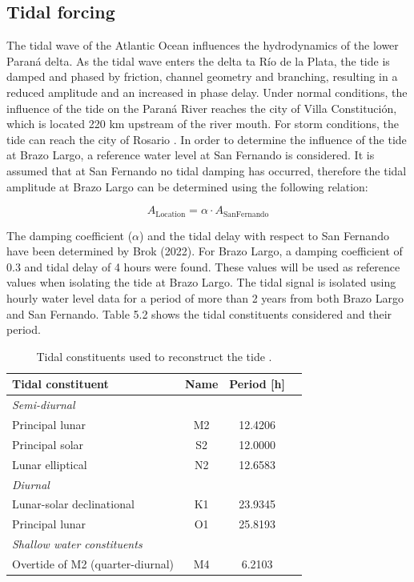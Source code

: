 \subsection{Tidal forcing}
The tidal wave of the Atlantic Ocean influences the hydrodynamics of the lower Paraná delta. As the tidal wave enters the delta ta Río de la Plata, the tide is damped and phased by friction, channel geometry and branching, resulting in a reduced amplitude and an increased in phase delay. Under normal conditions, the influence of the tide on the Paraná River reaches the city of Villa Constitución, which is located 220 km upstream of the river mouth. For storm conditions, the tide can reach the city of Rosario \autocite{balayCAUSESPERIODICITYLARGE1958}. In order to determine the influence of the tide at Brazo Largo, a reference water level at San Fernando is considered. It is assumed that at San Fernando no tidal damping has occurred, therefore the tidal amplitude at Brazo Largo can be determined using the following relation:

\begin{equation}
    A_{\text{Location}} = \alpha \cdot A_{\text{SanFernando}}
\end{equation}

The damping coefficient ($\alpha$) and the tidal delay with respect to San Fernando have been determined by Brok (2022). For Brazo Largo, a damping coefficient of 0.3 and tidal delay of 4 hours were found. These values will be used as reference values when isolating the tide at Brazo Largo. The tidal signal is isolated using hourly water level data for a period of more than 2 years from both Brazo Largo and San Fernando. Table 5.2 shows the tidal constituents  considered and their period.

\begin{table}[h!]
\centering
\caption{Tidal constituents used to reconstruct the tide
\autocite{BRON}.}
\label{tab:constituents}
\begin{tabular}{lccc}
\hline
\textbf{Tidal constituent} & \textbf{Name} & \textbf{Period [h]} \\
\hline
\multicolumn{3}{l}{\textit{Semi-diurnal}} \\
\hspace{1em}Principal lunar & M2 & 12.4206\\
\hspace{1em}Principal solar & S2 & 12.0000 \\
\hspace{1em}Lunar elliptical & N2 & 12.6583\\
\hline
\multicolumn{3}{l}{\textit{Diurnal}} \\
\hspace{1em}Lunar-solar declinational & K1 & 23.9345  \\
\hspace{1em}Principal lunar & O1 & 25.8193  \\
\hline
\multicolumn{3}{l}{\textit{Shallow water constituents}} \\
\hspace{1em}Overtide of M2 (quarter-diurnal) & M4 & 6.2103  \\
\hline
\end{tabular}
\end{table}


